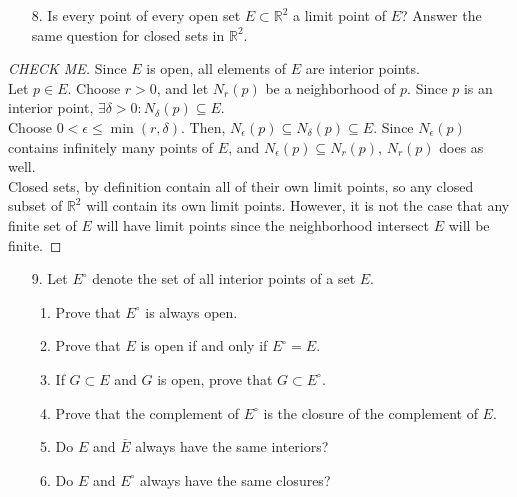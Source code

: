 \documentclass[10pt]{article}
\theoremstyle{definition}
\theoremstyle{plain}
\newcommand{\R}{\mathbb{R}}
\begin{document}
\pagebreak



\begin{enumerate}
\item[8.] Is every point of every open set $E \subset \R^2$ a limit point of $E$? Answer the same question for closed sets in $\R^2$.
\end{enumerate}

\begin{proof}[CHECK ME]
Since $E$ is open, all elements of $E$ are interior points. \\

Let $p\in E$. Choose $r>0$, and let $N_r(p)$ be a neighborhood of $p$. Since $p$ is an interior point, $\exists \delta > 0: N_\delta (p) \subseteq E$. \\

Choose $0<\epsilon \leq \min(r,\delta)$. Then, $N_\epsilon (p) \subseteq N_\delta (p) \subseteq E$. Since $N_\epsilon (p)$ contains infinitely many points of $E$, and $N_\epsilon (p) \subseteq N_r (p)$, $N_r(p)$ does as well. \\

Closed sets, by definition contain all of their own limit points, so any closed subset of $\R^2$ will contain its own limit points. However, it is not the case that any finite set of $E$ will have limit points since the neighborhood intersect $E$ will be finite.
\end{proof}




\pagebreak




\begin{enumerate}
\item[9.] Let $E^\circ$ denote the set of all interior points of a set $E$.
\begin{enumerate}
  \item Prove that $E^\circ$ is always open.
  \item Prove that $E$ is open if and only if $E^\circ = E$.
  \item If $G \subset E$ and $G$ is open, prove that $G\subset E^\circ$.
  \item Prove that the complement of $E^\circ$ is the closure of the complement of $E$.
  \item Do $E$ and $\bar{E}$ always have the same interiors?
  \item Do $E$ and $E^\circ$ always have the same closures?
\end{enumerate}
\end{enumerate}
\end{document}
